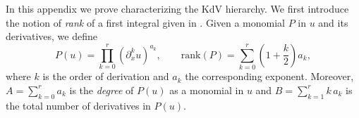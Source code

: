 \documentclass[a4paper,10pt,reqno]{article}
\theoremstyle{definition}
\theoremstyle{plain}
\theoremstyle{plain}
\theoremstyle{definition}
\theoremstyle{plain}
\theoremstyle{plain}
\theoremstyle{plain}
\newtheorem{lemma}[definition]{Lemma}
\theoremstyle{definition}
\theoremstyle{definition}
\def \N{\mathbb N}
\def \R{\mathbb R}
\def \C{\mathbb C}
\def \pa{{\partial}}
\def \T{\mathbb{T}}
\def \M{\mathcal{M}}
\def \k{\bm{k}}
\def \j{\bm{j}}
\begin{document}
In this appendix we prove  characterizing the KdV hierarchy.
We first introduce the notion of \textit{rank} of a first integral given in \cite{miura}.
Given a monomial $P$ in $u$ and its derivatives, we define
\begin{equation}\label{def_rank}
P(u) = \prod_{k=0}^r (\pa_x^k u)^{a_k},\qquad 
\mathrm{rank}(P) = \sum_{k = 0}^r \left ( 1+\frac{k}{2} \right ) a_k,
\end{equation}
where $k$ is the order of derivation and $a_k$ the corresponding exponent. Moreover, $A= \sum_{k=0}^r a_k$ is the \emph{degree} of $P(u)$ as a monomial in $u$ and $B=\sum_{k=1}^{r} k\, a_k$ is the total number of derivatives in $P(u)$.
\end{document}
